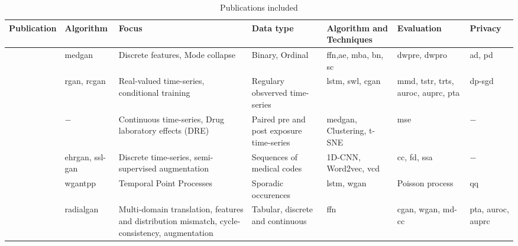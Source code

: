     \begin{sidewaystable}[htbp]
    \scriptsize
    \centering
    \caption{Publications included}\label{tab:publications}
      
        \begin{tabularx}{\textwidth}{@{}p{3cm}XXXXXX@{}} \toprule
            Publication 
            & Algorithm 
            & Focus 
            & Data type 
            & Algorithm and Techniques 
            & Evaluation 
            & Privacy\\ \midrule
            
            \cite{Choi2017-nt}
            & \gls{medgan} 
            & Discrete features, Mode collapse 
            & Binary, Ordinal 
            & \gls{ffn},\gls{ae}, \gls{mba}, \gls{bn}, \gls{sc} 
            & \gls{dwpre}, \gls{dwpro} 
            & \gls{ad}, \gls{pd}\\
            
            \cite{esteban2017real}
            & \gls{rgan}, \gls{rcgan} 
            & Real-valued time-series, conditional training 
            & Regulary obsverved time-series 
            & \gls{lstm}, \gls{swl}, \gls{cgan} 
            & \gls{mmd}, \gls{tstr}, \gls{trts}, \gls{auroc}, \gls{auprc}, \gls{pta} 
            & \gls{dp-sgd}\\
            
            \cite{yahi2017generative} 
            & $-$
            & Continuous time-series, Drug laboratory effects (DRE) 
            & Paired pre and post exposure time-series 
            & \gls{medgan}, Clustering, t-SNE 
            & \gls{mse}
            & $-$ \\
            
            \cite{Che_2017} 
            & \gls{ehrgan}, \gls{ssl-gan} 
            & Discrete time-series, semi-supervised augmentation 
            & Sequences of medical codes 
            & 1D-CNN, Word2vec, \gls{vcd}  
            &\gls{cc}, \gls{fd}, \gls{ssa}
            & $-$\\
            
            \cite{Xiao2017-lh} 
            & \gls{wgantpp} 
            & Temporal Point Processes 
            & Sporadic occurences 
            & \gls{lstm}, \gls{wgan} 
            & Poisson process 
            & \gls{qq} \\
            
            \cite{Yoon2018-radial}
            & \gls{radialgan} 
            & Multi-domain translation, features and distribution mismatch, cycle-consistency, augmentation 
            & Tabular, discrete and continuous 
            & \gls{ffn} 
            & \gls{cgan}, \gls{wgan}, \gls{md-cc} 
            & \gls{pta}, \gls{auroc}, \gls{auprc} \\
            

\end{tabularx}
\end{sidewaystable}
